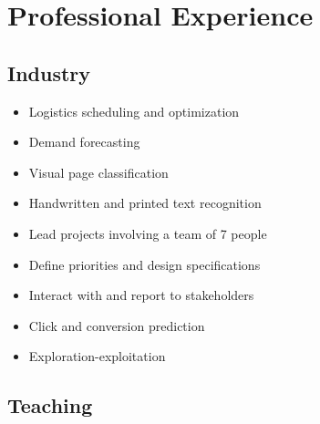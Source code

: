 \documentclass[11pt,a4paper,sans]{moderncv}   %
\begin{document}
\makecvtitle

\section{Professional Experience}

\subsection{Industry}

{
\begin{itemize}
	\item Logistics scheduling and optimization
	\item Demand forecasting
\end{itemize}
}

{
\begin{itemize}
	\item Visual page classification
	\item Handwritten and printed text recognition 
\end{itemize}
}

{
\begin{itemize}
	\item Lead projects involving a team of 7 people
	\item Define priorities and design specifications
	\item Interact with and report to stakeholders
\end{itemize}
}
\vspace*{-1em}
{
\begin{itemize}
	\item Click and conversion prediction
	\item Exploration-exploitation
\end{itemize}
}

\subsection{Teaching}
\end{document}
